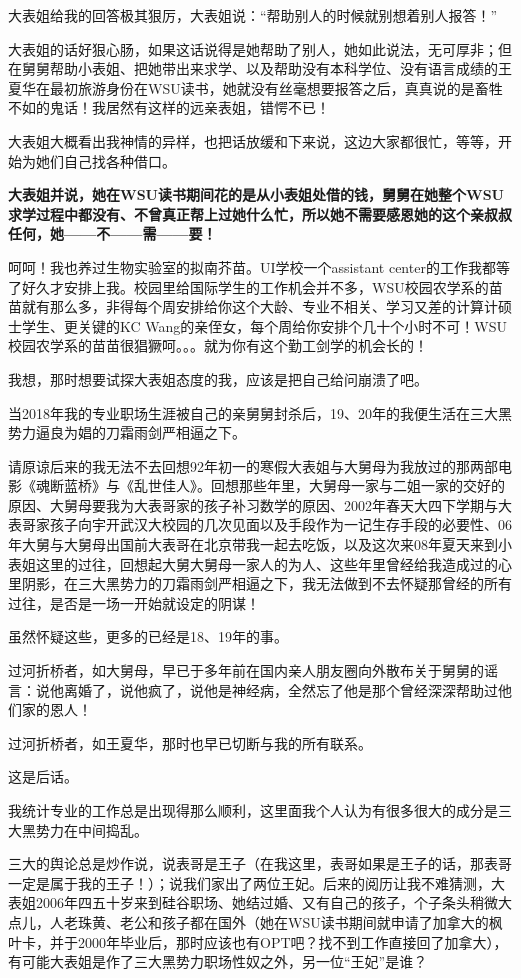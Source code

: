 \documentclass[9pt, b5paper]{article}
\begin{document}
大表姐给我的回答极其狠厉，大表姐说：“帮助别人的时候就别想着别人报答！”

大表姐的话好狠心肠，如果这话说得是她帮助了别人，她如此说法，无可厚非；但在舅舅帮助小表姐、把她带出来求学、以及帮助没有本科学位、没有语言成绩的王夏华在最初旅游身份在WSU读书，她就没有丝毫想要报答之后，真真说的是畜牲不如的鬼话！我居然有这样的远亲表姐，错愕不已！

大表姐大概看出我神情的异样，也把话放缓和下来说，这边大家都很忙，等等，开始为她们自己找各种借口。

\textbf{大表姐并说，她在WSU读书期间花的是从小表姐处借的钱，舅舅在她整个WSU求学过程中都没有、不曾真正帮上过她什么忙，所以她不需要感恩她的这个亲叔叔任何，她——不——需——要！}

呵呵！我也养过生物实验室的拟南芥苗。UI学校一个assistant center的工作我都等了好久才安排上我。校园里给国际学生的工作机会并不多，WSU校园农学系的苗苗就有那么多，非得每个周安排给你这个大龄、专业不相关、学习又差的计算计硕士学生、更关键的KC Wang的亲侄女，每个周给你安排个几十个小时不可！WSU校园农学系的苗苗很猖獗呵。。。就为你有这个勤工剑学的机会长的！

我想，那时想要试探大表姐态度的我，应该是把自己给问崩溃了吧。

当2018年我的专业职场生涯被自己的亲舅舅封杀后，19、20年的我便生活在三大黑势力逼良为娼的刀霜雨剑严相逼之下。

请原谅后来的我无法不去回想92年初一的寒假大表姐与大舅母为我放过的那两部电影《魂断蓝桥》与《乱世佳人》。回想那些年里，大舅母一家与二姐一家的交好的原因、大舅母要我为大表哥家的孩子补习数学的原因、2002年春天大四下学期与大表哥家孩子向宇开武汉大校园的几次见面以及手段作为一记生存手段的必要性、06年大舅与大舅母出国前大表哥在北京带我一起去吃饭，以及这次来08年夏天来到小表姐这里的过往，回想起大舅大舅母一家人的为人、这些年里曾经给我造成过的心里阴影，在三大黑势力的刀霜雨剑严相逼之下，我无法做到不去怀疑那曾经的所有过往，是否是一场一开始就设定的阴谋！

虽然怀疑这些，更多的已经是18、19年的事。

过河折桥者，如大舅母，早已于多年前在国内亲人朋友圈向外散布关于舅舅的谣言：说他离婚了，说他疯了，说他是神经病，全然忘了他是那个曾经深深帮助过他们家的恩人！

过河折桥者，如王夏华，那时也早已切断与我的所有联系。

这是后话。 

我统计专业的工作总是出现得那么顺利，这里面我个人认为有很多很大的成分是三大黑势力在中间捣乱。

三大的舆论总是炒作说，说表哥是王子（在我这里，表哥如果是王子的话，那表哥一定是属于我的王子！）；说我们家出了两位王妃。后来的阅历让我不难猜测，大表姐2006年四五十岁来到硅谷职场、她结过婚、又有自己的孩子，个子条头稍微大点儿，人老珠黄、老公和孩子都在国外（她在WSU读书期间就申请了加拿大的枫叶卡，并于2000年毕业后，那时应该也有OPT吧？找不到工作直接回了加拿大），有可能大表姐是作了三大黑势力职场性奴之外，另一位“王妃”是谁？
\end{document}
